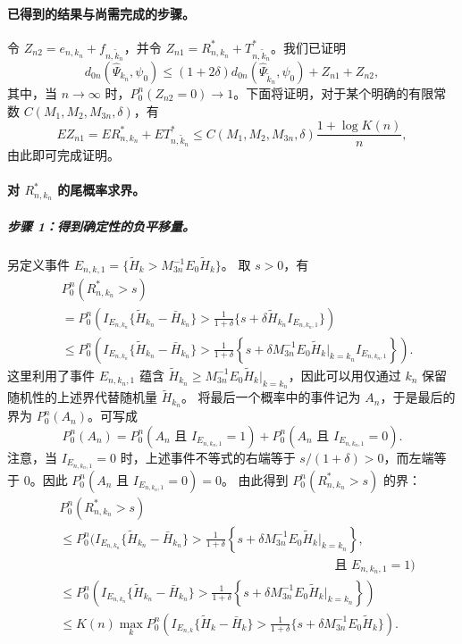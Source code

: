 \paragraph{已得到的结果与尚需完成的步骤。}
令 $Z_{n2}=e_{n,k_n}+f_{n,\widetilde k_n}$，并令
$Z_{n1}=R^*_{n,k_n}+T^*_{n,\widetilde k_n}$。我们已证明
\[
d_{0n}(\widehat\Psi_{k_n},\psi_0)
 \le(1+2\delta)d_{0n}(\widehat\Psi_{\widetilde k_n},\psi_0)+Z_{n1}+Z_{n2},
\]
其中，当 $n\to\infty$ 时，$P_0^n(Z_{n2}=0)\to1$。下面将证明，对于某个明确的有限常数
$C(M_1,M_2,M_{3n},\delta)$，有
\[
EZ_{n1}=ER^*_{n,k_n}+ET^*_{n,\widetilde k_n}
 \le C(M_1,M_2,M_{3n},\delta)\frac{1+\log K(n)}n,
\]
由此即可完成证明。

\paragraph{对 $R^*_{n,k_n}$ 的尾概率求界。}
\subparagraph{步骤 1：得到确定性的负平移量。}
另定义事件 $E_{n,k,1}=\{\widetilde H_k>M_{3n}^{-1}E_0\widetilde H_k\}$。
取 $s>0$，有
\[
\begin{aligned}
&P_0^n(R^*_{n,k_n}>s)\\
&=P_0^n\left(I_{E_{n,k_n}}\{\widetilde H_{k_n}-\bar H_{k_n}\}
 >\frac1{1+\delta}\{s+\delta\widetilde H_{k_n}I_{E_{n,k_n,1}}\}\right)\\
&\le P_0^n\left(I_{E_{n,k_n}}\{\widetilde H_{k_n}-\bar H_{k_n}\}
 >\frac1{1+\delta}\left\{s+\delta M_{3n}^{-1}
 E_0\widetilde H_k\big|_{k=k_n}I_{E_{n,k_n,1}}\right\}\right).
\end{aligned}
\]
这里利用了事件 $E_{n,k_n,1}$ 蕴含
$\widetilde H_{k_n}\ge M_{3n}^{-1}E_0\widetilde H_k|_{k=k_n}$，因此可以用仅通过 $k_n$ 保留随机性的上述界代替随机量 $\widetilde H_{k_n}$。
将最后一个概率中的事件记为 $A_n$，于是最后的界为 $P_0^n(A_n)$。可写成
\[
P_0^n(A_n)=P_0^n(A_n\text{ 且 }I_{E_{n,k_n,1}}=1)
 +P_0^n(A_n\text{ 且 }I_{E_{n,k_n,1}}=0).
\]
注意，当 $I_{E_{n,k_n,1}}=0$ 时，上述事件不等式的右端等于
$s/(1+\delta)>0$，而左端等于 0。因此
$P_0^n(A_n\text{ 且 }I_{E_{n,k_n,1}}=0)=0$。
由此得到 $P_0^n(R^*_{n,k_n}>s)$ 的界：
\[
\begin{aligned}
&P_0^n(R^*_{n,k_n}>s)\\
&\le P_0^n\Biggl(I_{E_{n,k_n}}\{\widetilde H_{k_n}-\bar H_{k_n}\}
 >\frac1{1+\delta}\left\{s+\delta M_{3n}^{-1}E_0\widetilde H_k\big|_{k=k_n}\right\},\\
&\hspace{22em}\text{且 }E_{n,k_n,1}=1\Biggr)\\
&\le P_0^n\left(I_{E_{n,k_n}}\{\widetilde H_{k_n}-\bar H_{k_n}\}
 >\frac1{1+\delta}\left\{s+\delta M_{3n}^{-1}E_0\widetilde H_k\big|_{k=k_n}\right\}\right)\\
&\le K(n)\max_kP_0^n\left(I_{E_{n,k}}\{\widetilde H_k-\bar H_k\}
 >\frac1{1+\delta}\{s+\delta M_{3n}^{-1}E_0\widetilde H_k\}\right).
\end{aligned}
\]

